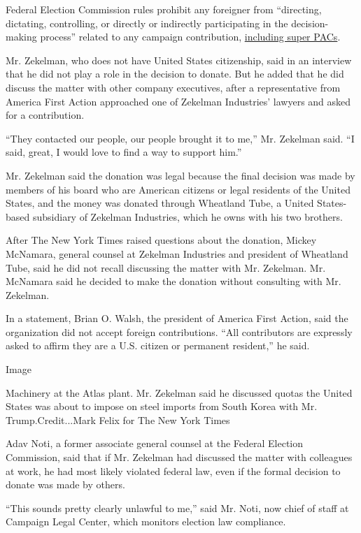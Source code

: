 Federal Election Commission rules prohibit any foreigner from
``directing, dictating, controlling, or directly or indirectly
participating in the decision-making process'' related to any campaign
contribution,
\href{https://www.fec.gov/help-candidates-and-committees/taking-receipts-pac/contributions-to-super-pacs-and-hybrid-pacs/}{including
super PACs}.

Mr. Zekelman, who does not have United States citizenship, said in an
interview that he did not play a role in the decision to donate. But he
added that he did discuss the matter with other company executives,
after a representative from America First Action approached one of
Zekelman Industries' lawyers and asked for a contribution.

``They contacted our people, our people brought it to me,'' Mr. Zekelman
said. ``I said, great, I would love to find a way to support him.''

Mr. Zekelman said the donation was legal because the final decision was
made by members of his board who are American citizens or legal
residents of the United States, and the money was donated through
Wheatland Tube, a United States-based subsidiary of Zekelman Industries,
which he owns with his two brothers.

After The New York Times raised questions about the donation, Mickey
McNamara, general counsel at Zekelman Industries and president of
Wheatland Tube, said he did not recall discussing the matter with Mr.
Zekelman. Mr. McNamara said he decided to make the donation without
consulting with Mr. Zekelman.

In a statement, Brian O. Walsh, the president of America First Action,
said the organization did not accept foreign contributions. ``All
contributors are expressly asked to affirm they are a U.S. citizen or
permanent resident,'' he said.

Image

Machinery at the Atlas plant. Mr. Zekelman said he discussed quotas the
United States was about to impose on steel imports from South Korea with
Mr. Trump.Credit...Mark Felix for The New York Times

Adav Noti, a former associate general counsel at the Federal Election
Commission, said that if Mr. Zekelman had discussed the matter with
colleagues at work, he had most likely violated federal law, even if the
formal decision to donate was made by others.

``This sounds pretty clearly unlawful to me,'' said Mr. Noti, now chief
of staff at Campaign Legal Center, which monitors election law
compliance.

